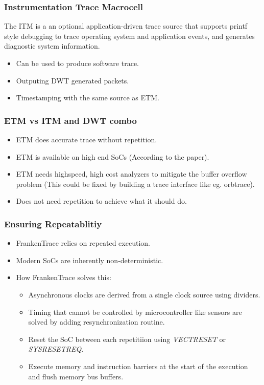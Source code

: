 \documentclass{beamer}
\begin{document}
\begin{frame}
    \frametitle{Instrumentation Trace Macrocell}
    The ITM is a an optional application-driven trace source that supports
    printf style debugging to trace operating system and application events,
    and generates diagnostic system information.
    \begin{itemize}
        \item Can be used to produce software trace.
        \item Outputing DWT generated packets.
        \item Timestamping with the same source as ETM.
    \end{itemize}
\end{frame}

\begin{frame}
    \frametitle{ETM vs ITM and DWT combo}
    \begin{itemize}
        \item ETM does accurate trace without repetition.
        \item ETM is available on high end SoCs (According to the paper).
        \item ETM needs highspeed, high cost analyzers to mitigate the buffer
            overflow problem (This could be fixed by building a trace
            interface like eg. orbtrace).
        \item Does not need repetition to achieve what it should do.
    \end{itemize}
\end{frame}

\begin{frame}
    \frametitle{Ensuring Repeatablitiy}
    \begin{itemize}
        \item FrankenTrace relies on repeated execution.
        \item Modern SoCs are inherently non-deterministic.
        \item How FrankenTrace solves this:
            \begin{itemize}
                \item Asynchronous clocks are derived from a single clock
                    source using dividers.
                \item Timing that cannot be controlled by microcontroller
                    like sensors are solved by adding resynchronization
                    routine.
                \item Reset the SoC between each repetitiion using
                    \textit{VECTRESET} or \textit{SYSRESETREQ}.
                \item Execute memory and instruction barriers at the start of
                    the execution and flush memory bus buffers.
            \end{itemize}
    \end{itemize}
\end{frame}
\end{document}

